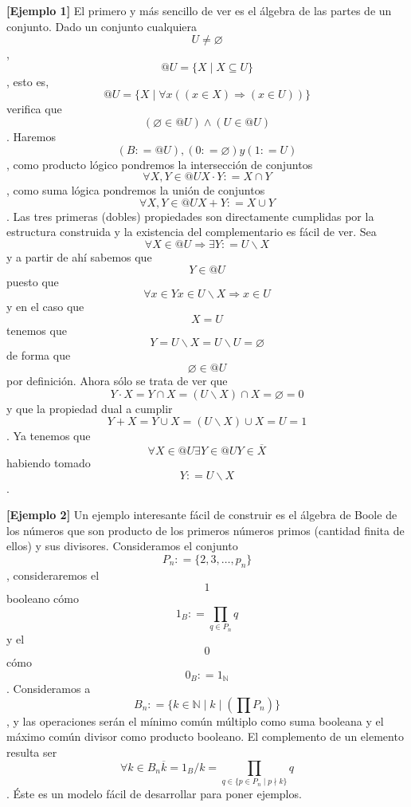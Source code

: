 \documentclass[
]{article}
\begin{document}
\begin{enumerate}
  \textbf{{[}Ejemplo 1{]} }El primero y más sencillo de ver es el
  álgebra de las partes de un conjunto. Dado un conjunto
  cualquiera\[U \neq \varnothing\],
  \[{@U} = {\{{X \mid {X \subseteq U}}\}}\], esto es,
  \[{@U} = {\{{X \mid {{\forall x}\left( {{({x \in X})}\Rightarrow{({x \in U})}} \right)}}\}}\]
  verifica
  que\[\left( {{\varnothing \in @}U} \right) \land \left( {{U \in @}U} \right)\].
  Ha\-remos\[\left( {B{: = @}U} \right),\left( {0{: = \varnothing}} \right)y\left( {1{: = U}} \right)\],
  como producto lógico pondremos la intersección de
  conjuntos\[\forall X,{Y \in @}U{X \cdot Y}{: = {X \cap Y}}\], como
  suma lógica pondremos la unión de
  conjuntos\[\forall X,{Y \in @}U{X + Y}{: = {X \cup Y}}\]. Las tres
  primeras (dobles) propiedades son di\-rectamente cumplidas por la
  estructura construida y la existencia del complementario es fá\-cil de
  ver. Sea
  \[\forall{X \in @}U\Rightarrow\exists Y{: = {U \smallsetminus X}}\]y a
  partir de ahí sabemos que\[{Y \in @}U\]puesto
  que\[\forall{x \in Y}{x \in {U \smallsetminus X}}\Rightarrow{x \in U}\]y
  en el caso que\[X = U\]tenemos que
  \[{{Y = {U \smallsetminus X}} = {U \smallsetminus U}} = \varnothing\]de
  forma que\[{\varnothing \in @}U\]por definición. Ahora sólo se trata
  de ver
  que\[{{{{Y \cdot X} = {Y \cap X}} = {{({U \smallsetminus X})} \cap X}} = \varnothing} = 0\]y
  que la propiedad dual a
  cumplir\[{{{{Y + X} = {Y \cup X}} = {{({U \smallsetminus X})} \cup X}} = U} = 1\].
  Ya tenemos
  que\[\forall{X \in @}U\exists{Y \in @}U{Y \in \overline{X}}\]ha\-biendo
  tomado\[Y{: = {U \smallsetminus X}}\].

  \textbf{{[}Ejemplo 2{]}} Un ejemplo interesante fácil de construir es
  el álgebra de Boole de los números que son producto de los primeros
  núme\-ros primos (cantidad finita de ellos) y sus divisores.
  Consideramos el conjunto \[P_{n}{: = {\{{2,3,\ldots,p_{n}}\}}}\],
  con\-sideraremos el \[1\] booleano
  cómo\[1_{B}{: = {\prod\limits_{q \in P_{n}}q}}\]y el \[0\]
  cómo\[0_{B}{: = 1_{\mathbb{N}}}\]. Consideramos a
  \[B_{n}{: = {\{{{k \in \mathbb{N}} \mid {k \mid \left( {\prod P_{n}} \right)}}\}}}\],
  y las operaciones serán el mínimo común múltiplo como suma booleana y
  el máximo común divisor como producto booleano. El complemento de un
  ele\-mento resulta ser
  \[\forall{k \in B_{n}}{{\overline{k} = {1_{B}/k}} = {\prod\limits_{q \in {\{{{{p \in P_{n}} \mid p} \nmid k}\}}}q}}\].
  Éste es un modelo fácil de desarrollar para poner ejemplos.


\end{enumerate}
\end{document}
